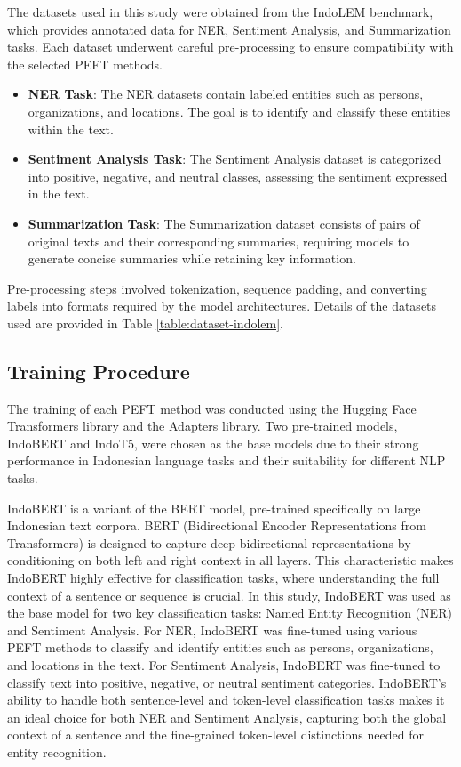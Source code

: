 The datasets used in this study were obtained from the IndoLEM benchmark, which provides annotated data for NER, Sentiment Analysis, and Summarization tasks. Each dataset underwent careful pre-processing to ensure compatibility with the selected PEFT methods.

\begin{itemize}
    \item \textbf{NER Task}: The NER datasets contain labeled entities such as persons, organizations, and locations. The goal is to identify and classify these entities within the text.
    \item \textbf{Sentiment Analysis Task}: The Sentiment Analysis dataset is categorized into positive, negative, and neutral classes, assessing the sentiment expressed in the text.
    \item \textbf{Summarization Task}: The Summarization dataset consists of pairs of original texts and their corresponding summaries, requiring models to generate concise summaries while retaining key information.
\end{itemize}

Pre-processing steps involved tokenization, sequence padding, and converting labels into formats required by the model architectures. Details of the datasets used are provided in Table \ref{table:dataset-indolem}.

\subsection{Training Procedure}

The training of each PEFT method was conducted using the Hugging Face Transformers library and the Adapters library. Two pre-trained models, IndoBERT and IndoT5, were chosen as the base models due to their strong performance in Indonesian language tasks and their suitability for different NLP tasks.

IndoBERT is a variant of the BERT model, pre-trained specifically on large Indonesian text corpora. BERT (Bidirectional Encoder Representations from Transformers) is designed to capture deep bidirectional representations by conditioning on both left and right context in all layers. This characteristic makes IndoBERT highly effective for classification tasks, where understanding the full context of a sentence or sequence is crucial. In this study, IndoBERT was used as the base model for two key classification tasks: Named Entity Recognition (NER) and Sentiment Analysis. For NER, IndoBERT was fine-tuned using various PEFT methods to classify and identify entities such as persons, organizations, and locations in the text. For Sentiment Analysis, IndoBERT was fine-tuned to classify text into positive, negative, or neutral sentiment categories. IndoBERT’s ability to handle both sentence-level and token-level classification tasks makes it an ideal choice for both NER and Sentiment Analysis, capturing both the global context of a sentence and the fine-grained token-level distinctions needed for entity recognition.

